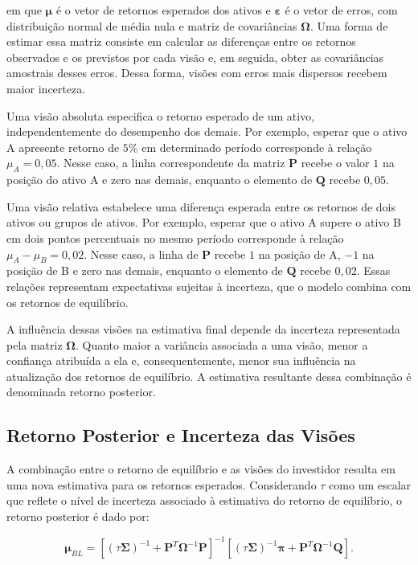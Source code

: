 \noindent em que $\boldsymbol{\mu}$ é o vetor de retornos esperados dos ativos e $\boldsymbol{\varepsilon}$ é o vetor de erros, com distribuição normal de média nula e matriz de covariâncias $\boldsymbol{\Omega}$. Uma forma de estimar essa matriz consiste em calcular as diferenças entre os retornos observados e os previstos por cada visão e, em seguida, obter as covariâncias amostrais desses erros. Dessa forma, visões com erros mais dispersos recebem maior incerteza.

Uma visão absoluta especifica o retorno esperado de um ativo,
independentemente do desempenho dos demais. Por exemplo, esperar
que o ativo A apresente retorno de $5\%$ em determinado período
corresponde à relação $\mu_A = 0{,}05$. Nesse caso, a linha
correspondente da matriz $\mathbf{P}$ recebe o valor $1$ na posição
do ativo A e zero nas demais, enquanto o elemento de $\mathbf{Q}$
recebe $0{,}05$.

Uma visão relativa estabelece uma diferença esperada entre os
retornos de dois ativos ou grupos de ativos. Por exemplo, esperar
que o ativo A supere o ativo B em dois pontos percentuais no mesmo
período corresponde à relação $\mu_A - \mu_B = 0{,}02$. Nesse caso,
a linha de $\mathbf{P}$ recebe $1$ na posição de A, $-1$ na posição
de B e zero nas demais, enquanto o elemento de $\mathbf{Q}$
recebe $0{,}02$. Essas relações representam expectativas sujeitas
à incerteza, que o modelo combina com os retornos de equilíbrio.

A influência dessas visões na estimativa final depende da incerteza
representada pela matriz $\boldsymbol{\Omega}$. Quanto maior a
variância associada a uma visão, menor a confiança atribuída a ela
e, consequentemente, menor sua influência na atualização dos
retornos de equilíbrio. A estimativa resultante dessa combinação
é denominada retorno posterior.

\subsection{Retorno Posterior e Incerteza das Visões}
\label{subsec:bl_posterior}

A combinação entre o retorno de equilíbrio e as visões do investidor resulta em uma nova estimativa para os retornos esperados. Considerando $\tau$ como um escalar que reflete o nível de incerteza associado à estimativa do retorno de equilíbrio, o retorno posterior é dado por:

\begin{equation}
    \boldsymbol{\mu}_{BL} = \left[ (\tau\boldsymbol{\Sigma})^{-1} + \mathbf{P}^{T}\boldsymbol{\Omega}^{-1}\mathbf{P} \right]^{-1} \left[ (\tau\boldsymbol{\Sigma})^{-1}\boldsymbol{\pi} + \mathbf{P}^{T}\boldsymbol{\Omega}^{-1}\mathbf{Q} \right].
    \label{eq:bl_posterior}
\end{equation}

